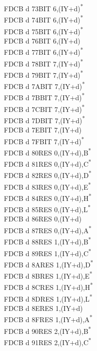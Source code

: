 \documentclass[twoside,openright,a4paper]{book}
\begin{document}
\begin{multicols}{3}
{\begin{tabbing}
	FDCB d 73\>BIT 6,(IY+d)\textsuperscript{*}\\
	FDCB d 74\>BIT 6,(IY+d)\textsuperscript{*}\\
	FDCB d 75\>BIT 6,(IY+d)\textsuperscript{*}\\
	FDCB d 76\>BIT 6,(IY+d)\\
	FDCB d 77\>BIT 6,(IY+d)\textsuperscript{*}\\
	FDCB d 78\>BIT 7,(IY+d)\textsuperscript{*}\\
	FDCB d 79\>BIT 7,(IY+d)\textsuperscript{*}\\
	FDCB d 7A\>BIT 7,(IY+d)\textsuperscript{*}\\
	FDCB d 7B\>BIT 7,(IY+d)\textsuperscript{*}\\
	FDCB d 7C\>BIT 7,(IY+d)\textsuperscript{*}\\
	FDCB d 7D\>BIT 7,(IY+d)\textsuperscript{*}\\
	FDCB d 7E\>BIT 7,(IY+d)\\
	FDCB d 7F\>BIT 7,(IY+d)\textsuperscript{*}\\
	FDCB d 80\>RES 0,(IY+d),B\textsuperscript{*}\\
	FDCB d 81\>RES 0,(IY+d),C\textsuperscript{*}\\
	FDCB d 82\>RES 0,(IY+d),D\textsuperscript{*}\\
	FDCB d 83\>RES 0,(IY+d),E\textsuperscript{*}\\
	FDCB d 84\>RES 0,(IY+d),H\textsuperscript{*}\\
	FDCB d 85\>RES 0,(IY+d),L\textsuperscript{*}\\
	FDCB d 86\>RES 0,(IY+d)\\
	FDCB d 87\>RES 0,(IY+d),A\textsuperscript{*}\\
	FDCB d 88\>RES 1,(IY+d),B\textsuperscript{*}\\
	FDCB d 89\>RES 1,(IY+d),C\textsuperscript{*}\\
	FDCB d 8A\>RES 1,(IY+d),D\textsuperscript{*}\\
	FDCB d 8B\>RES 1,(IY+d),E\textsuperscript{*}\\
	FDCB d 8C\>RES 1,(IY+d),H\textsuperscript{*}\\
	FDCB d 8D\>RES 1,(IY+d),L\textsuperscript{*}\\
	FDCB d 8E\>RES 1,(IY+d)\\
	FDCB d 8F\>RES 1,(IY+d),A\textsuperscript{*}\\
	FDCB d 90\>RES 2,(IY+d),B\textsuperscript{*}\\
	FDCB d 91\>RES 2,(IY+d),C\textsuperscript{*}\\

\end{tabbing}}
\end{multicols}
\end{document}
